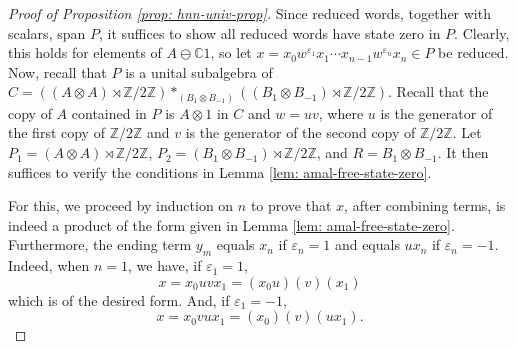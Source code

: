 \documentclass{amsart}
\theoremstyle{definition}
\newcommand{\Z}{\mathbb{Z}}
\begin{document}
\begin{proof}[Proof of Proposition \ref{prop: hnn-univ-prop}]
    Since reduced words, together with scalars, span $P$, it suffices to show all reduced words have state zero in $P$. Clearly, this holds for elements of $A \ominus \mathbb{C}1$, so let $x = x_0w^{\varepsilon_1}x_1\cdots x_{n-1}w^{\varepsilon_n}x_n \in P$ be reduced. Now, recall that $P$ is a unital subalgebra of $C = ((A\otimes A)\rtimes \Z/2\Z) *_{(B_1\otimes B_{-1})}((B_1\otimes B_{-1})\rtimes \Z/2\Z)$. Recall that the copy of $A$ contained in $P$ is $A \otimes 1$ in $C$ and $w = uv$, where $u$ is the generator of the first copy of $\Z/2\Z$ and $v$ is the generator of the second copy of $\Z/2\Z$. Let $P_1 = (A\otimes A)\rtimes \Z/2\Z$, $P_2 = (B_1\otimes B_{-1})\rtimes \Z/2\Z$, and $R = B_1\otimes B_{-1}$. It then suffices to verify the conditions in Lemma \ref{lem: amal-free-state-zero}.

    For this, we proceed by induction on $n$ to prove that $x$, after combining terms, is indeed a product of the form given in Lemma \ref{lem: amal-free-state-zero}. Furthermore, the ending term $y_m$ equals $x_n$ if $\varepsilon_n = 1$ and equals $ux_n$ if $\varepsilon_n = -1$. Indeed, when $n = 1$, we have, if $\varepsilon_1 = 1$,
    \begin{equation*}
        x = x_0uvx_1 = (x_0u)(v)(x_1)
    \end{equation*}
    which is of the desired form. And, if $\varepsilon_1 = -1$,
    \begin{equation*}
        x = x_0vux_1 = (x_0)(v)(ux_1).
    \end{equation*}


\end{proof}
\end{document}
